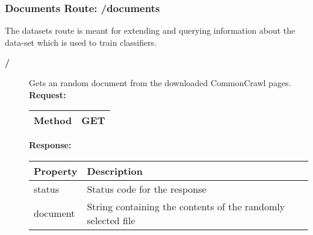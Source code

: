 \subsubsection{Documents Route: /documents}
The datasets route is meant for extending and querying information about the data-set which is used to train classifiers. 

\begin{description}


\item [{\large \textbf{/}}]
Gets an random document from the downloaded CommonCrawl pages.
\newline
\newline
\textbf{Request:}
\newline
\newline
\begin{tabular}{ | l | l |}
\hline
Method & GET\\ \hline
\end{tabular}
\newline
\newline
\textbf{Response:}
\newline
\newline
\resizebox{\textwidth}{!} {
\begin{tabular}{ | l | l |}
\hline
\textbf{Property} & \textbf{Description}\\ \hline
status & Status code for the response\\ \hline
document & String containing the contents of the randomly selected file\\ \hline
\end{tabular}}

\end{description}
